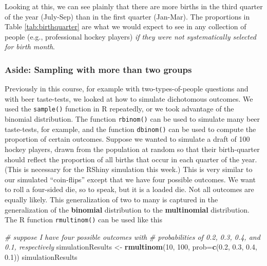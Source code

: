 \documentclass[openany]{book}
\newenvironment{Shaded}{\begin{snugshade}}{\end{snugshade}}
\newcommand{\CommentTok}[1]{\textcolor[rgb]{0.56,0.35,0.01}{\textit{#1}}}
\newcommand{\DataTypeTok}[1]{\textcolor[rgb]{0.13,0.29,0.53}{#1}}
\newcommand{\DecValTok}[1]{\textcolor[rgb]{0.00,0.00,0.81}{#1}}
\newcommand{\FloatTok}[1]{\textcolor[rgb]{0.00,0.00,0.81}{#1}}
\newcommand{\KeywordTok}[1]{\textcolor[rgb]{0.13,0.29,0.53}{\textbf{#1}}}
\newcommand{\NormalTok}[1]{#1}
\newcommand{\StringTok}[1]{\textcolor[rgb]{0.31,0.60,0.02}{#1}}
\begin{document}
Looking at this, we can see plainly that there are more births in the third quarter of the year (July-Sep) than in the first quarter (Jan-Mar). The proportions in Table \ref{tab:birthquarter} are what we would expect to see in any collection of people (e.g., professional hockey players) \emph{if they were not systematically selected for birth month}.

\hypertarget{aside-sampling-with-more-than-two-groups}{%
\subsubsection*{Aside: Sampling with more than two groups}\label{aside-sampling-with-more-than-two-groups}}

Previously in this course, for example with two-types-of-people questions and with beer taste-tests, we looked at how to simulate dichotomous outcomes. We used the \texttt{sample()} function in R repeatedly, or we took advantage of the binomial distribution. The function \texttt{rbinom()} can be used to simulate many beer taste-tests, for example, and the function \texttt{dbinom()} can be used to compute the proportion of certain outcomes. Suppose we wanted to simulate a draft of 100 hockey players, drawn from the population at random so that their birth-quarter should reflect the proportion of all births that occur in each quarter of the year. (This is necessary for the RShiny simulation this week.) This is very similar to our simulated ``coin-flips'' except that we have four possible outcomes. We want to roll a four-sided die, so to speak, but it is a loaded die. Not all outcomes are equally likely. This generalization of two to many is captured in the generalization of the \textbf{binomial} distribution to the \textbf{multinomial} distribution. The R function \texttt{rmultinom()} can be used like this

\begin{Shaded}
\begin{Highlighting}[]
\CommentTok{# suppose I have four possible outcomes with}
\CommentTok{# probabilities of 0.2, 0.3, 0.4, and 0.1, respectively}
\NormalTok{simulationResults <-}\StringTok{ }\KeywordTok{rmultinom}\NormalTok{(}\DecValTok{10}\NormalTok{, }\DecValTok{100}\NormalTok{, }\DataTypeTok{prob=}\KeywordTok{c}\NormalTok{(}\FloatTok{0.2}\NormalTok{, }\FloatTok{0.3}\NormalTok{, }\FloatTok{0.4}\NormalTok{, }\FloatTok{0.1}\NormalTok{))}
\NormalTok{simulationResults}
\end{Highlighting}
\end{Shaded}
\end{document}
